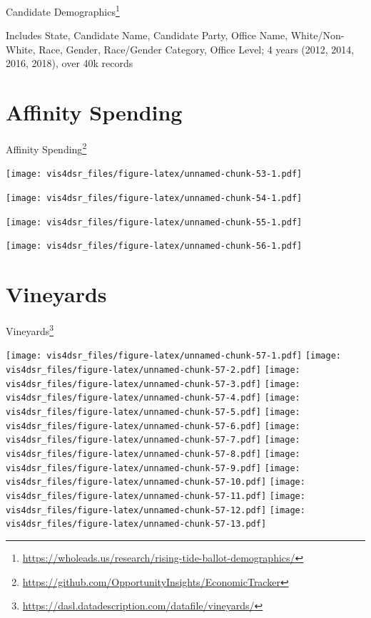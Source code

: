 \documentclass[
]{krantz}
\renewcommand{\href}[2]{#2\footnote{\url{#1}}}
\begin{document}
\href{https://wholeads.us/research/rising-tide-ballot-demographics/}{Candidate Demographics}

Includes State, Candidate Name, Candidate Party, Office Name, White/Non-White, Race, Gender, Race/Gender Category, Office Level; 4 years (2012, 2014, 2016, 2018), over 40k records

\hypertarget{affinity-spending}{%
\section*{Affinity Spending}\label{affinity-spending}}


\href{https://github.com/OpportunityInsights/EconomicTracker}{Affinity Spending}

\texttt{[image: vis4dsr\_files/figure-latex/unnamed-chunk-53-1.pdf]}

\texttt{[image: vis4dsr\_files/figure-latex/unnamed-chunk-54-1.pdf]}

\texttt{[image: vis4dsr\_files/figure-latex/unnamed-chunk-55-1.pdf]}

\texttt{[image: vis4dsr\_files/figure-latex/unnamed-chunk-56-1.pdf]}

\hypertarget{vineyards}{%
\section*{Vineyards}\label{vineyards}}


\href{https://dasl.datadescription.com/datafile/vineyards/}{Vineyards}

\texttt{[image: vis4dsr\_files/figure-latex/unnamed-chunk-57-1.pdf]} \texttt{[image: vis4dsr\_files/figure-latex/unnamed-chunk-57-2.pdf]} \texttt{[image: vis4dsr\_files/figure-latex/unnamed-chunk-57-3.pdf]} \texttt{[image: vis4dsr\_files/figure-latex/unnamed-chunk-57-4.pdf]} \texttt{[image: vis4dsr\_files/figure-latex/unnamed-chunk-57-5.pdf]} \texttt{[image: vis4dsr\_files/figure-latex/unnamed-chunk-57-6.pdf]} \texttt{[image: vis4dsr\_files/figure-latex/unnamed-chunk-57-7.pdf]} \texttt{[image: vis4dsr\_files/figure-latex/unnamed-chunk-57-8.pdf]} \texttt{[image: vis4dsr\_files/figure-latex/unnamed-chunk-57-9.pdf]} \texttt{[image: vis4dsr\_files/figure-latex/unnamed-chunk-57-10.pdf]} \texttt{[image: vis4dsr\_files/figure-latex/unnamed-chunk-57-11.pdf]} \texttt{[image: vis4dsr\_files/figure-latex/unnamed-chunk-57-12.pdf]} \texttt{[image: vis4dsr\_files/figure-latex/unnamed-chunk-57-13.pdf]}

  

\backmatter
\printindex
\end{document}

